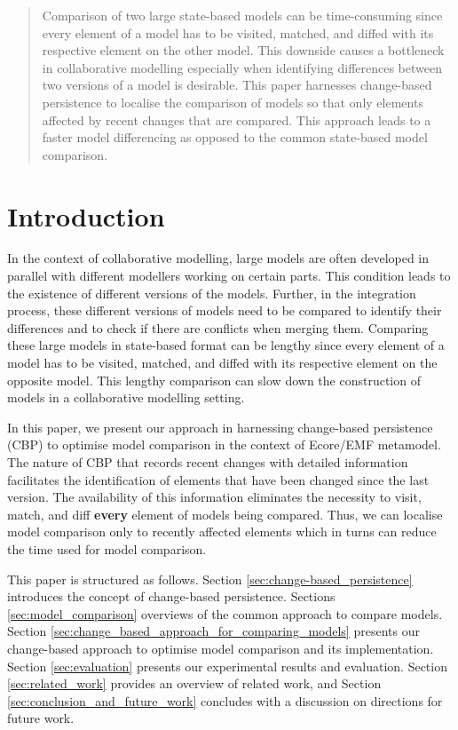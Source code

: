 \documentclass{llncs}
\begin{document}
\begin{abstract}
Comparison of two large state-based models can be time-consuming since every element of a model has to be visited, matched, and diffed with its respective element on the other model. This downside causes a bottleneck in collaborative modelling especially when identifying differences between two versions of a model is desirable. This paper harnesses change-based persistence to localise the comparison of models so that only elements affected by recent changes that are compared. This approach leads to a faster model differencing as opposed to the common state-based model comparison. 
\end{abstract}

\vspace{-20pt}
\section{Introduction}
\label{sec:introduction}
In the context of collaborative modelling, large models are often developed in parallel with different modellers working on certain parts. This condition leads to the existence of different versions of the models. Further, in the integration process, these different versions of models need to be compared to identify their differences and to check if there are conflicts when merging them. Comparing these large models in state-based format can be lengthy since every element of a model has to be visited, matched, and diffed with its respective element on the opposite model. 
This lengthy comparison can slow down the construction of models in a collaborative modelling setting. 

In this paper, we present our approach in harnessing change-based persistence (CBP) to optimise model comparison in the context of Ecore/EMF metamodel. The nature of CBP that records recent changes with detailed information facilitates the identification of elements that have been changed since the last version. The availability of this information eliminates the necessity to visit, match, and diff \textbf{every} element of models being compared. Thus, we can localise model comparison only to recently affected elements which in turns can reduce the time used for model comparison.

This paper is structured as follows. Section \ref{sec:change-based_persistence} introduces the concept of change-based persistence. Sections \ref{sec:model_comparison} overviews of the common approach to compare models.
Section \ref{sec:change_based_approach_for_comparing_models} presents our change-based approach to optimise model comparison and its implementation. Section \ref{sec:evaluation} presents our experimental results and evaluation. Section \ref{sec:related_work} provides an overview of related work, and Section \ref{sec:conclusion_and_future_work} concludes with a discussion on directions for future work.
\end{document}
